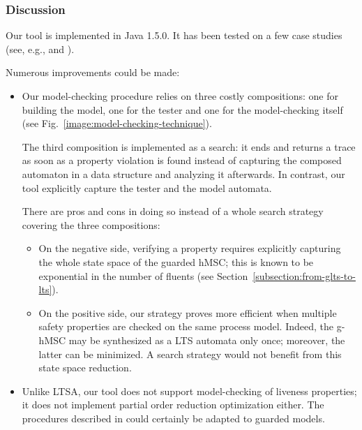 \subsubsection*{Discussion}

Our tool is implemented in Java 1.5.0. It has been tested on a few case studies (see, e.g., \cite{Damas:2010} and \cite{Damas:2011}). 

Numerous improvements could be made:
\begin{itemize}
\item Our model-checking procedure relies on three costly compositions: one for building the model, one for the tester and one for the model-checking itself (see Fig.~\ref{image:model-checking-technique}). 

The third composition is implemented as a search: it ends and returns a trace as soon as a property violation is found instead of capturing the composed automaton in a data structure and analyzing it afterwards. In contrast, our tool explicitly capture the tester and the model automata. 

There are pros and cons in doing so instead of a whole search strategy covering the three compositions:
\begin{itemize}
\item On the negative side, verifying a property requires explicitly capturing the whole state space of the guarded hMSC; this is known to be exponential in the number of fluents (see Section~\ref{subsection:from-glts-to-lts}).
\item On the positive side, our strategy proves more efficient when multiple safety properties are checked on the same process model. Indeed, the g-hMSC may be synthesized as a LTS automata only once; moreover, the latter can be minimized. A search strategy would not benefit from this state space reduction.
\end{itemize}

\item Unlike LTSA, our tool does not support model-checking of liveness properties; it does not implement partial order reduction optimization either. The procedures described in \cite{Giannakopoulou:2003} could certainly be adapted to guarded models.
\end{itemize}



